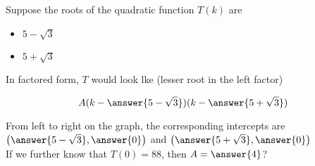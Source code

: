 \documentclass{ximera}
\author{Lee Wayand}
\begin{document}
\begin{exercise} Suppose the roots of the quadratic function $T(k)$ are



\begin{itemize}
\item $5 - \sqrt{3}$
\item $5 + \sqrt{3}$
\end{itemize}


In factored form, $T$ would look lke (lesser root in the left factor)

\[ A (k - \answer{5 - \sqrt{3}})(k - \answer{5 + \sqrt{3}}) \]




From left to right on the graph, the corresponding intercepts are $\left( \answer{5 - \sqrt{3}}, \answer{0} \right)$ and $\left( \answer{5 + \sqrt{3}}, \answer{0} \right)$ \\



If we further know that $T(0) = 88$, then $A = \answer{4}$?





\end{exercise}
\end{document}

